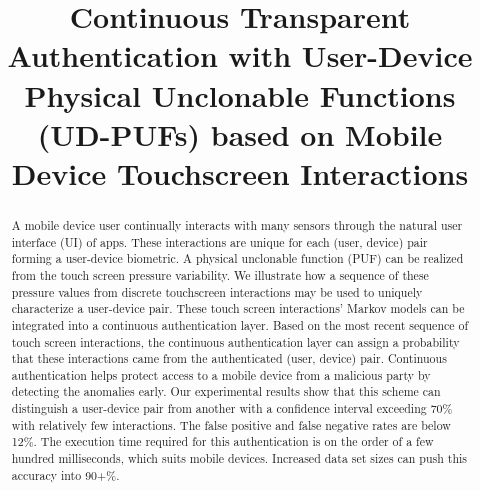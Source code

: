 \documentclass{acm_proc_article-sp}
\title{Continuous Transparent Authentication with User-Device Physical Unclonable Functions (UD-PUFs) based on Mobile Device Touchscreen Interactions}
\begin{document}
\maketitle
\begin{abstract}
A mobile device user continually interacts with many sensors through the natural
user interface (UI) of apps. 
These interactions are unique for each (user, device) pair
forming a user-device biometric.  
%
A physical unclonable function (PUF) can be realized
from the touch screen pressure variability.
%
We illustrate how a sequence of these pressure values 
from discrete touchscreen interactions 
may be used to uniquely characterize a user-device pair.
%
These touch screen interactions' Markov models can be integrated into a
continuous authentication layer.
%
Based on the most recent sequence of touch screen interactions,
the continuous authentication layer can assign a probability that these
interactions came from the authenticated (user, device) pair.
%
Continuous authentication helps protect access to a mobile device
from a malicious party by detecting the anomalies early.
%
Our experimental results show that this scheme can distinguish a user-device
pair from another with a confidence interval exceeding 70\%
with relatively few interactions. 
The false positive and false negative rates are below 12\%.
%
The execution time required for this authentication is 
on the order of a few hundred milliseconds, which suits mobile devices.
%
Increased data set sizes can push this accuracy into 90+\%.
\end{abstract}



\end{document}
